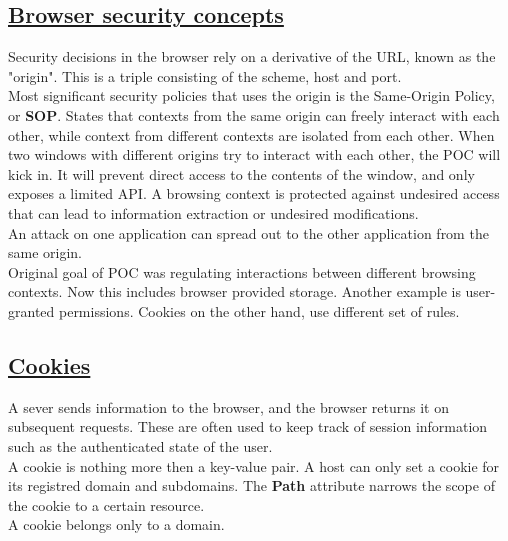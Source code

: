 \documentclass[titlepage]{article}
\begin{document}
    \subsection{\href{https://youtu.be/McG0sGeb34w}{Browser security concepts}}
    Security decisions in the browser rely on a derivative of the URL, known as the "origin". This is a triple consisting of the scheme, host and port.\\
    Most significant security policies that uses the origin is the Same-Origin Policy, or \textbf{SOP}. States that contexts from the same origin can freely interact with each other, while context from different contexts are isolated from each other.
    When two windows with different origins try to interact with each other, the POC will kick in. It will prevent direct access to the contents of the window, and only exposes a limited API. A browsing context is protected against undesired access that can lead to information extraction or undesired modifications.\\
    An attack on one application can spread out to the other application from the same origin.\\
    Original goal of POC was regulating interactions between different browsing contexts. Now this includes browser provided storage. Another example is user-granted permissions. Cookies on the other hand, use different set of rules.
    \subsection{\href{https://youtu.be/wHX1cwoC9Vc}{Cookies}}
    A sever sends information to the browser, and the browser returns it on subsequent requests. These are often used to keep track of session information such as the authenticated state of the user.\\
    A cookie is nothing more then a key-value pair. A host can only set a cookie for its registred domain and subdomains. The \textbf{Path} attribute narrows the scope of the cookie to a certain resource.\\
    A cookie belongs only to a domain.
\end{document}

